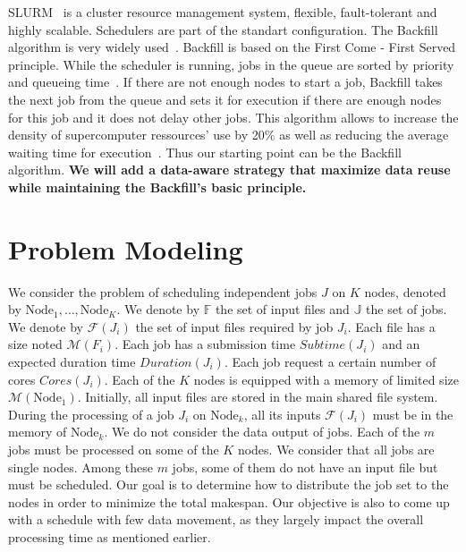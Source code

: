 \documentclass[a4paper]{article}
\newcommand{\Node}[1]{\ensuremath{\mathrm{Node}_{#1}}\xspace}
\newcommand{\inputs}{\ensuremath{\mathcal{F}}\xspace}
\newcommand{\memory}{\ensuremath{\mathcal{M}}\xspace}
\newcommand{\duration}{\mathit{Duration}\xspace}
\newcommand{\core}{\mathit{Cores}\xspace}
\newcommand{\submissiontime}{\mathit{Subtime}\xspace}
\newcommand{\fileset}{\ensuremath{\mathbb{F}}\xspace}
\newcommand{\jobset}{\ensuremath{\mathbb{J}}\xspace}
\begin{document}
SLURM~\cite{SLURM} is a cluster resource management system, flexible, fault-tolerant and highly scalable.
Schedulers are part of the standart configuration. The Backfill algorithm is very widely used~\cite{New_Backfill}.
Backfill is based on the First Come - First Served principle. While the scheduler is running, jobs in the queue are sorted by priority and queueing time~\cite{New_Backfill}.
If there are not enough nodes to start a job, Backfill takes the next job from the queue and sets it for execution if there are enough nodes for this job and 
it does not delay other jobs.
This algorithm allows to increase the density of supercomputer ressources' use by 20\% as well as reducing the average waiting time
for execution~\cite{Maui_Scheduler}.
Thus our starting point can be the Backfill algorithm.
\textbf{We will add a data-aware strategy that maximize data reuse while maintaining the Backfill's basic principle.}

\section{Problem Modeling}
We consider the problem of scheduling independent jobs $J$ on $K$ nodes,
denoted by $\Node{1},\ldots, \Node{K}$.
We denote by $\fileset$ the set of input files and $\jobset$ the set of jobs.
We denote by $\inputs(J_i)$ the set of input files required by job $J_i$. 
Each file has a size noted $\memory(F_i)$.
Each job has a submission time $\submissiontime(J_i)$ and an 
expected duration time $\duration(J_i)$.
Each job request a certain number of cores $\core(J_i)$. 
Each of the $K$ nodes is equipped with a memory of limited size $\memory(\Node{1})$.
Initially, all input files are stored in the main shared file system.
During the processing of a job $J_i$ on $\Node{k}$, all its inputs
$\inputs(J_i)$ must be in the memory of $\Node{k}$. 
We do not consider the data output of jobs.
Each of the $m$ jobs must be processed on some of the $K$ nodes. 
We consider that all jobs are single nodes.
Among these $m$ jobs, some of them do not have an input file but must be scheduled.
Our goal is to determine how to distribute the job set to
the nodes in order to minimize the total makespan.
Our objective is also to come up with a schedule with
few data movement, as they largely impact the overall processing
time as mentioned earlier. 
\end{document}
